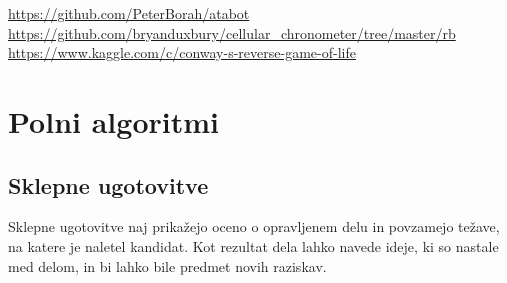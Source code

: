 \documentclass[12pt,a4paper,openany,twoside]{book}
\begin{document}
\cite{Erlan2012}
\url{https://github.com/PeterBorah/atabot}
\url{https://github.com/bryanduxbury/cellular_chronometer/tree/master/rb}
\url{https://www.kaggle.com/c/conway-s-reverse-game-of-life}

\section{Polni algoritmi}


\subsection{Sklepne ugotovitve}

Sklepne ugotovitve naj prikažejo oceno o opravljenem delu in povzamejo težave, na katere je naletel kandidat. Kot rezultat dela
lahko navede ideje, ki so nastale med delom, in bi lahko bile predmet novih raziskav.

\newpage


\appendix


\newpage

\listoffigures

\newpage

\listoftables



\newpage


\label{stran_literatura}
 
\end{document}
